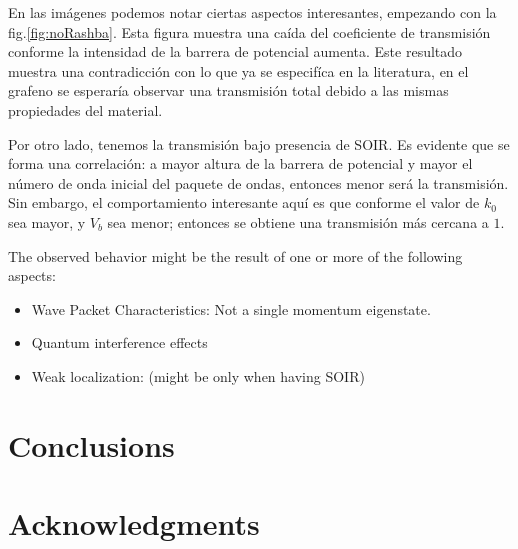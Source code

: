 \documentclass[twocolumn]{revtex4-2}
\begin{document}
    En las imágenes podemos notar ciertas aspectos interesantes, empezando con la fig.\ref{fig:noRashba}.
    Esta figura muestra una caída del coeficiente de transmisión conforme la intensidad de la barrera de potencial aumenta.
    Este resultado muestra una contradicción con lo que ya se especifíca en la literatura, en el grafeno se esperaría observar una transmisión total debido a las mismas propiedades del material\cite{horsell2008, Young2009}.

    Por otro lado, tenemos la transmisión bajo presencia de SOIR.
    Es evidente que se forma una correlación: a mayor altura de la barrera de potencial y mayor el número de onda inicial del paquete de ondas, entonces menor será la transmisión.
    Sin embargo, el comportamiento interesante aquí es que conforme el valor de $k_0$ sea mayor, y $V_b$ sea menor; entonces se obtiene una transmisión más cercana a $1$.

        The observed behavior might be the result of one or more of the following aspects:

    \begin{itemize}
        \item Wave Packet Characteristics: Not a single momentum eigenstate.
        \item Quantum interference effects\cite{MolgadoMex2018}
        \item Weak localization: (might be only when having SOIR)
    \end{itemize}

    \section{Conclusions}\label{sec:conclusions}


    \section*{Acknowledgments}

    
    
\end{document}

